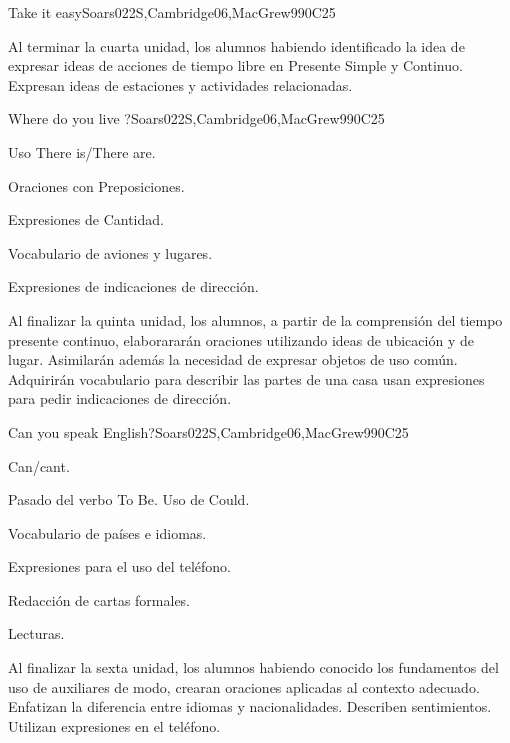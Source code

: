 \begin{syllabus}
\begin{unit}{Take it easy}{}{Soars022S,Cambridge06,MacGrew99}{0}{C25}
   \begin{learningoutcomes}
      \item Al terminar la cuarta unidad, los alumnos habiendo identificado la idea de expresar ideas de acciones de tiempo libre en Presente Simple y Continuo. Expresan ideas de estaciones y actividades relacionadas.
   \end{learningoutcomes}

\end{unit}

\begin{unit}{Where do you live ?}{}{Soars022S,Cambridge06,MacGrew99}{0}{C25}
   \begin{topics}
      \item Uso There is/There are.
      \item Oraciones con Preposiciones.
      \item Expresiones de Cantidad.
      \item Vocabulario de aviones y lugares.
      \item Expresiones de indicaciones de dirección.
   \end{topics}

   \begin{learningoutcomes}
      \item Al finalizar la quinta unidad, los alumnos, a partir de la comprensión del tiempo presente continuo, elaborararán oraciones utilizando ideas de ubicación y de lugar. Asimilarán además la necesidad de expresar objetos de uso común. Adquirirán vocabulario para describir las partes de una casa usan expresiones para pedir indicaciones de dirección.
   \end{learningoutcomes}
\end{unit}

\begin{unit}{Can you speak English?}{}{Soars022S,Cambridge06,MacGrew99}{0}{C25}
   \begin{topics}
      \item Can/cant.
      \item Pasado del verbo To Be. Uso de Could.
      \item Vocabulario de países e idiomas.
      \item Expresiones para el uso del teléfono.
      \item Redacción de cartas formales.
      \item Lecturas.
   \end{topics}

   \begin{learningoutcomes}
      \item Al finalizar la sexta unidad, los alumnos habiendo conocido los fundamentos del uso de auxiliares de modo, crearan oraciones aplicadas al contexto adecuado. Enfatizan la diferencia entre idiomas y nacionalidades. Describen sentimientos. Utilizan expresiones en el teléfono.
   \end{learningoutcomes}
\end{unit}


\end{syllabus}
